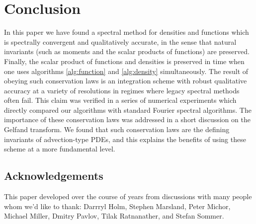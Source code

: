 \documentclass[final,leqno]{siamltex1213}
\begin{document}
\section{Conclusion}

In this paper we have found a spectral method for densities and functions which is spectrally convergent
and qualitatively accurate, in the sense that natural invariants (such as moments and the scalar products of functions) are preserved.
Finally, the scalar product of functions and densities is preserved in time when one uses algorithms \ref{alg:function} and \ref{alg:density} simultaneously.
The result of obeying such conservation laws is an integration scheme with robust qualitative accuracy at a variety of resolutions in regimes where legacy spectral methods often fail.
This claim was verified in a series of numerical experiments which directly compared our algorithms with standard Fourier spectral algorithms.
The importance of these conservation laws was addressed in a short discussion on the Gelfand transform.
We found that such conservation laws are the defining invariants of advection-type PDEs, and this explains the benefits of using these scheme at a more fundamental level.


\subsection{Acknowledgements}
This paper developed over the course of years from discussions with many people whom we'd like to thank:
 	Darrryl Holm, Stephen Marsland, Peter Michor, Michael Miller, Dmitry Pavlov, Tilak Ratnanather, and Stefan Sommer.
\end{document}
